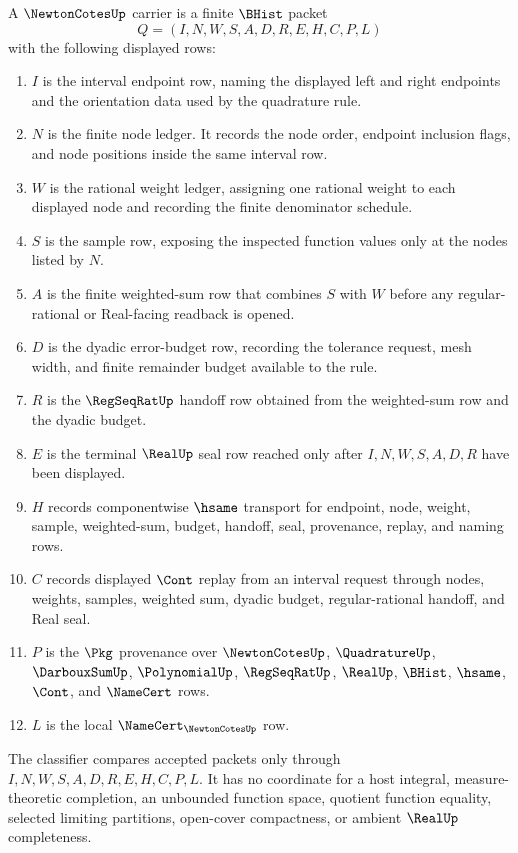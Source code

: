 \begin{definition}
\label{def:newton-cotes-carrier}
A $\NewtonCotesUp$ carrier is a finite $\BHist$ packet
$$
Q=(I,N,W,S,A,D,R,E,H,C,P,L)
$$
with the following displayed rows:
\begin{enumerate}
\item $I$ is the interval endpoint row, naming the displayed left and right endpoints and the orientation data used by the quadrature rule.
\item $N$ is the finite node ledger. It records the node order, endpoint inclusion flags, and node positions inside the same interval row.
\item $W$ is the rational weight ledger, assigning one rational weight to each displayed node and recording the finite denominator schedule.
\item $S$ is the sample row, exposing the inspected function values only at the nodes listed by $N$.
\item $A$ is the finite weighted-sum row that combines $S$ with $W$ before any regular-rational or Real-facing readback is opened.
\item $D$ is the dyadic error-budget row, recording the tolerance request, mesh width, and finite remainder budget available to the rule.
\item $R$ is the $\RegSeqRatUp$ handoff row obtained from the weighted-sum row and the dyadic budget.
\item $E$ is the terminal $\RealUp$ seal row reached only after $I,N,W,S,A,D,R$ have been displayed.
\item $H$ records componentwise $\hsame$ transport for endpoint, node, weight, sample, weighted-sum, budget, handoff, seal, provenance, replay, and naming rows.
\item $C$ records displayed $\Cont$ replay from an interval request through nodes, weights, samples, weighted sum, dyadic budget, regular-rational handoff, and Real seal.
\item $P$ is the $\Pkg$ provenance over $\NewtonCotesUp$, $\QuadratureUp$, $\DarbouxSumUp$, $\PolynomialUp$, $\RegSeqRatUp$, $\RealUp$, $\BHist$, $\hsame$, $\Cont$, and $\NameCert$ rows.
\item $L$ is the local $\NameCert_{\NewtonCotesUp}$ row.
\end{enumerate}
The classifier compares accepted packets only through $I,N,W,S,A,D,R,E,H,C,P,L$. It has no coordinate for a host integral, measure-theoretic completion, an unbounded function space, quotient function equality, selected limiting partitions, open-cover compactness, or ambient $\RealUp$ completeness.
\end{definition}

